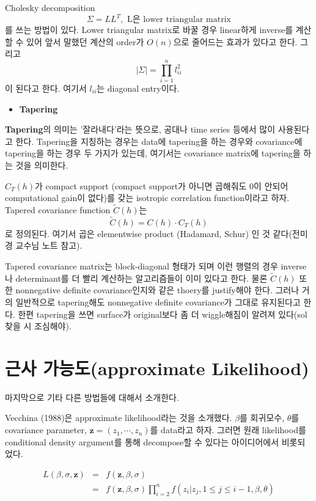 \documentclass[b5paper,]{book}
\providecommand{\tightlist}{%
  \setlength{\itemsep}{0pt}\setlength{\parskip}{0pt}}
\theoremstyle{definition}
\theoremstyle{definition}
\theoremstyle{definition}
\theoremstyle{remark}
\begin{document}
Cholesky decomposition
\[\Sigma=LL^{T}, \text{ L은 lower triangular matrix}\] 를 쓰는 방법이
있다. Lower triangular matrix로 바꿀 경우 linear하게 inverse를 계산할 수
있어 앞서 말했던 계산의 order가 \(O(n)\)으로 줄어드는 효과가 있다고
한다. 그리고 \[|\Sigma | = \prod_{i=1}^{n}l_{ii}^{2}\] 이 된다고 한다.
여기서 \(l_{ii}\)는 diagonal entry이다.

\begin{itemize}
\tightlist
\item
  \textbf{Tapering}
\end{itemize}

\textbf{Tapering}의 의미는 '잘라내다'라는 뜻으로, 공대나 time series
등에서 많이 사용된다고 한다. Tapering을 지칭하는 경우는 data에
tapering을 하는 경우와 covariance에 tapering을 하는 경우 두 가지가
있는데, 여기서는 covariance matrix에 tapering을 하는 것을 의미한다.

\(C_{T}(h)\)가 compact support (compact support가 아니면 곱해줘도 0이
안되어 computational gain이 없다)를 갖는 isotropic correlation
function이라고 하자. Tapered covariance function \(\tilde{C}(h)\)는
\[\tilde{C}(h)=C(h)\cdot C_{T}(h)\] 로 정의된다. 여기서 곱은 elementwise
product (Hadamard, Schur) 인 것 같다(전미경 교수님 노트 참고).

Tapered covariance matrix는 block-diagonal 형태가 되며 이런 행렬의 경우
inverse나 determinant를 더 빨리 계산하는 알고리즘들이 이미 있다고 한다.
물론 \(\tilde{C}(h)\) 또한 nonnegative definite covariance인지와 같은
thoery를 justify해야 한다. 그러나 거의 일반적으로 tapering해도
nonnegative definite covariance가 그대로 유지된다고 한다. 한편
tapering을 쓰면 surface가 original보다 좀 더 wiggle해짐이 알려져
있다(sol 찾을 시 조심해야).

\section{근사 가능도(approximate
Likelihood)}\label{-approximate-likelihood}

마지막으로 기타 다른 방법들에 대해서 소개한다.

Vecchina (1988)은 approximate likelihood라는 것을 소개했다. \(\beta\)를
회귀모수, \(\theta\)를 covariance parameter,
\(\mathbf{z}=(z_{1}, \cdots , z_{n})\)를 data라고 하자. 그러면 원래
likelihood를 conditional density argument를 통해 decompose할 수 있다는
아이디어에서 비롯되었다.

\begin{eqnarray*}
L(\beta, \sigma, \mathbf{z}) &=& f(\mathbf{z}, \beta, \sigma)\\
&=&f(\mathbf{z}, \beta, \sigma) \prod_{i=2}^{n}f(z_{i}|z_{j}, 1 \leq j \leq i-1, \beta, \theta)\\
\end{eqnarray*}
\end{document}
